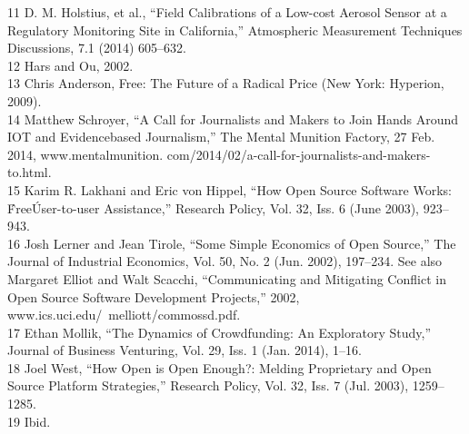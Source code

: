 \begin{itemize}
11 D. M. Holstius, et al., ``Field Calibrations of a Low-cost Aerosol Sensor at a Regulatory Monitoring
Site in California,'' Atmospheric Measurement Techniques Discussions, 7.1 (2014) 605–632.\\
12 Hars and Ou, 2002.\\
13 Chris Anderson, Free: The Future of a Radical Price (New York: Hyperion, 2009).\\
14 Matthew Schroyer, ``A Call for Journalists and Makers to Join Hands Around IOT and Evidencebased
Journalism,'' The Mental Munition Factory, 27 Feb. 2014, www.mentalmunition.
com/2014/02/a-call-for-journalists-and-makers-to.html.\\
15 Karim R. Lakhani and Eric von Hippel, ``How Open Source Software Works: \'Free\' User-to-user
Assistance,'' Research Policy, Vol. 32, Iss. 6 (June 2003), 923–943.\\
16 Josh Lerner and Jean Tirole, ``Some Simple Economics of Open Source,'' The Journal of Industrial
Economics, Vol. 50, No. 2 (Jun. 2002), 197–234. See also Margaret Elliot and Walt Scacchi,
``Communicating and Mitigating Conflict in Open Source Software Development Projects,'' 2002,
www.ics.uci.edu/~melliott/commossd.pdf.\\
17 Ethan Mollik, ``The Dynamics of Crowdfunding: An Exploratory Study,'' Journal of Business
Venturing, Vol. 29, Iss. 1 (Jan. 2014), 1–16.\\
18 Joel West, ``How Open is Open Enough?: Melding Proprietary and Open Source Platform
Strategies,'' Research Policy, Vol. 32, Iss. 7 (Jul. 2003), 1259–1285.\\
19 Ibid.\\


\end{itemize}
